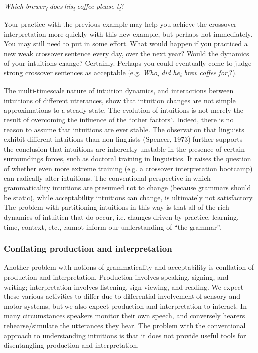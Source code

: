     \textit{Which} \textit{brewer\textsubscript{i}} \textit{does} \textit{his\textsubscript{i}} \textit{coffee} \textit{please} \textit{t\textsubscript{i}}?

  Your practice with the previous example may help you achieve the crossover interpretation more quickly with this new example, but perhaps not immediately. You may still need to put in some effort. What would happen if you practiced a new weak crossover sentence every day, over the next year? Would the dynamics of your intuitions change? Certainly. Perhaps you could eventually come to judge strong crossover sentences as acceptable (e.g. \textit{Who\textsubscript{i}} \textit{did} \textit{he\textsubscript{i}} \textit{brew} \textit{coffee} \textit{for\textsubscript{i}}?). 

  The multi-timescale nature of intuition dynamics, and interactions between intuitions of different utterances, show that intuition changes are not simple approximations to a steady state. The evolution of intuitions is not merely the result of overcoming the influence of the “other factors”. Indeed, there is no reason to assume that intuitions are ever stable. The observation that linguists exhibit different intuitions than non-linguists (Spencer, 1973) further supports the conclusion that intuitions are inherently unstable in the presence of certain surroundings forces, such as doctoral training in linguistics. It raises the question of whether even more extreme training (e.g. a crossover interpretation bootcamp) can radically alter intuitions. The conventional perspective in which grammaticality intuitions are presumed not to change (because grammars should be static), while acceptability intuitions can change, is ultimately not satisfactory. The problem with partitioning intuitions in this way is that all of the rich dynamics of intuition that do occur, i.e. changes driven by practice, learning, time, context, etc., cannot inform our understanding of “the grammar”.

\subsubsection{Conflating production and interpretation}

Another problem with notions of grammaticality and acceptability is conflation of production and interpretation. Production involves speaking, signing, and writing; interpretation involves listening, sign-viewing, and reading. We expect these various activities to differ due to differential involvement of sensory and motor systems, but we also expect production and interpretation to interact. In many circumstances speakers monitor their own speech, and conversely hearers rehearse/simulate the utterances they hear. The problem with the conventional approach to understanding intuitions is that it does not provide useful tools for disentangling production and interpretation.

